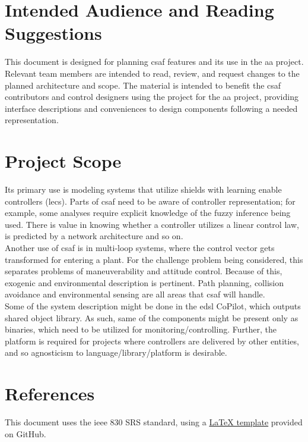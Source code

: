 \section{Intended Audience and Reading Suggestions}

This document is designed for planning \acrshort{csaf} features and its use in the \acrlong{aa} project. Relevant team members are intended to read, review, and request changes to the planned architecture and scope. The material is intended to benefit the \acrshort{csaf} contributors and control designers using the project for the \acrlong{aa} project, providing interface descriptions and conveniences to design components following a needed representation.\\

\section{Project Scope}
Its primary use is modeling systems that utilize shields with learning enable controllers (\acrshort{lec}s). Parts of \acrshort{csaf} need to be aware of controller representation; for example, some analyses require explicit knowledge of the fuzzy inference being used. There is value in knowing whether a controller utilizes a linear control law, is predicted by a network architecture and so on.\\

Another use of \acrshort{csaf} is in multi-loop systems, where the control vector gets transformed for entering a plant. For the challenge problem being considered, this separates problems of maneuverability and attitude control. Because of this, exogenic and environmental description is pertinent. Path planning, collision avoidance and environmental sensing are all areas that \acrshort{csaf} will handle.\\

Some of the system description might be done in the \acrshort{edsl} CoPilot, which outputs shared object library. As such, same of the components might be present only as binaries, which need to be utilized for monitoring/controlling. Further, the platform is required for projects where controllers are delivered by other entities, and so agnosticism to language/library/platform is desirable. 

\section{References}

This document uses the \acrshort{ieee} 830 SRS standard, using a \href{https://github.com/jpeisenbarth/SRS-Tex}{\LaTeX{} template} provided on GitHub.  \\
